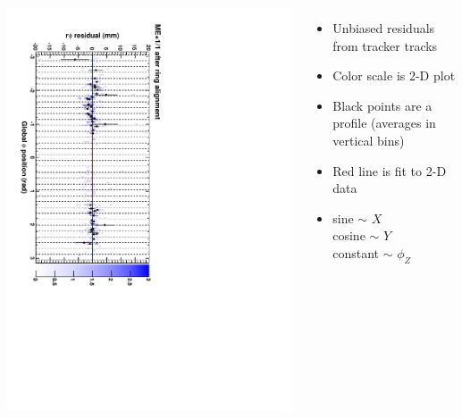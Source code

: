 \documentclass[compress]{beamer}
\begin{document}
\begin{frame}
\begin{columns}
\includegraphics[height=\linewidth, angle=90]{ringfits_after/mep11.pdf}
\begin{itemize}
\item Unbiased residuals from tracker tracks
\item Color scale is 2-D plot
\item Black points are a profile (averages in vertical bins)
\item Red line is fit to 2-D data
\item sine $\sim$ $X$ \\
cosine $\sim$ $Y$ \\
constant $\sim$ $\phi_Z$
\end{itemize}
\end{columns}
\end{frame}
\end{document}
